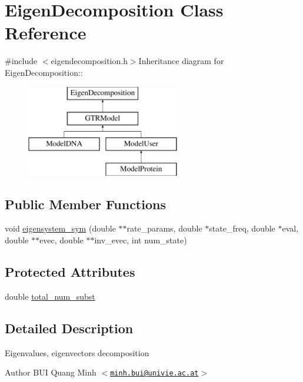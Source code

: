 \hypertarget{classEigenDecomposition}{
\section{EigenDecomposition Class Reference}
\label{classEigenDecomposition}
}


{\ttfamily \#include $<$eigendecomposition.h$>$}Inheritance diagram for EigenDecomposition::\begin{figure}[H]
\begin{center}
\leavevmode
\includegraphics[height=4cm]{classEigenDecomposition}
\end{center}
\end{figure}
\subsection*{Public Member Functions}
\begin{DoxyCompactItemize}
\item 
void \hyperlink{classEigenDecomposition_a9d97980b08c8f486b7ef26afff08947f}{eigensystem\_\-sym} (double $\ast$$\ast$rate\_\-params, double $\ast$state\_\-freq, double $\ast$eval, double $\ast$$\ast$evec, double $\ast$$\ast$inv\_\-evec, int num\_\-state)
\end{DoxyCompactItemize}
\subsection*{Protected Attributes}
\begin{DoxyCompactItemize}
\item 
double \hyperlink{classEigenDecomposition_ad628b6f3a05b9ba605698b9814f81e6f}{total\_\-num\_\-subst}
\end{DoxyCompactItemize}


\subsection{Detailed Description}
Eigenvalues, eigenvectors decomposition

\begin{DoxyAuthor}{Author}
BUI Quang Minh $<$\href{mailto:minh.bui@univie.ac.at}{\tt minh.bui@univie.ac.at}$>$ 
\end{DoxyAuthor}


